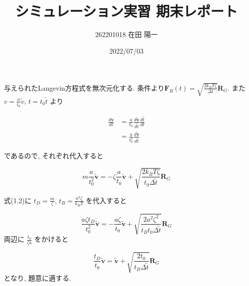 \documentclass[a4paper,dvipdfmx]{jarticle}
\begin{document}
\title{シミュレーション実習 期末レポート}
\author{262201018 在田 陽一}
\date{2022/07/03}
\maketitle


\section{}

\subsection{}

\noindent
与えられたLangevin方程式を無次元化する.
条件より$\bm{F}_B(t)=\sqrt{\frac{2k_BT\zeta}{\Delta t}}\bm{R}_G$. 
また $v=\frac{a}{t_0}\tilde{v}$, $t=t_0\tilde{t}$ より

\begin{align*}
    \frac{d\bm{v}}{dt} &= \frac{a}{t_0}\frac{d\bm{\tilde{v}}}{d\tilde{t}} \frac{d\tilde{t}}{dt} \\ 
    &= \frac{a}{t_0^2} \frac{d\bm{\tilde{v}}}{d\tilde{t}}  \tag{1.1}
\end{align*}

\noindent
であるので, それぞれ代入すると

\begin{equation}
    m \frac{a}{t_0^2} \bm{\dot{\tilde{v}}} = -\zeta \frac{a}{t_0} \bm{\tilde{v}} 
    + \sqrt{\frac{2k_BT \zeta}{t_0 \Delta \tilde{t}}}\bm{R}_G \tag{1.2}
\end{equation}

\noindent
式(1.2)に $t_D=\frac{m}{\zeta}$, $t_B=\frac{a^2 \zeta}{k_BT}$ を代入すると

\begin{equation}
    \frac{a\zeta t_D}{t_0^2} \bm{\dot{\tilde{v}}} = -\frac{a\zeta}{t_0} \bm{\tilde{v}} 
    + \sqrt{\frac{2a^2\zeta ^2}{t_Bt_0 \Delta \tilde{t}}}\bm{R}_G \tag{1.3} 
\end{equation}
両辺に $\frac{t_0}{\zeta a}$ をかけると

\begin{equation}
    \frac{t_D}{t_0} \bm{\dot{\tilde{v}}} = \bm{\tilde{v}} 
    + \sqrt{\frac{2t_0}{t_B\Delta \tilde{t}}}\bm{R}_G \tag{1.4} 
\end{equation}
となり, 題意に適する.


\subsection{}
\end{document}
